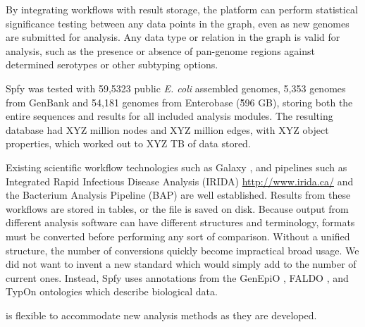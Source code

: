 By integrating workflows with result storage, the platform can perform statistical significance testing between any data points in the graph, even as new genomes are submitted for analysis. Any data type or relation in the graph is valid for analysis, such as the presence or absence of pan-genome regions against determined serotypes or other subtyping options.

Spfy was tested with 59,5323 public \textit{E. coli} assembled genomes, 5,353 genomes from GenBank and 54,181 genomes from Enterobase (\~596 GB), storing both the entire sequences and results for all included analysis modules.
The resulting database had XYZ million nodes and XYZ million edges, with XYZ object properties, which worked out to XYZ TB of data stored.


Existing scientific workflow technologies such as Galaxy \citep{goecks2010galaxy}, and pipelines such as Integrated Rapid Infectious Disease Analysis (IRIDA) \url{http://www.irida.ca/} and the Bacterium Analysis Pipeline (BAP) \citep{thomsen2016bacterial} are well established.
Results from these workflows are stored in tables, or the file is saved on disk.
Because output from different analysis software can have different structures and terminology, formats must be converted before performing any sort of comparison.
Without a unified structure, the number of conversions quickly become impractical broad usage.
We did not want to invent a new standard which would simply add to the number of current ones.
Instead, Spfy uses annotations from the GenEpiO \citep{griffiths2017context}, FALDO \citep{bolleman2016faldo}, and TypOn \citep{vaz2014typon} ontologies which describe biological data.

is flexible to accommodate new analysis methods as they are developed.



